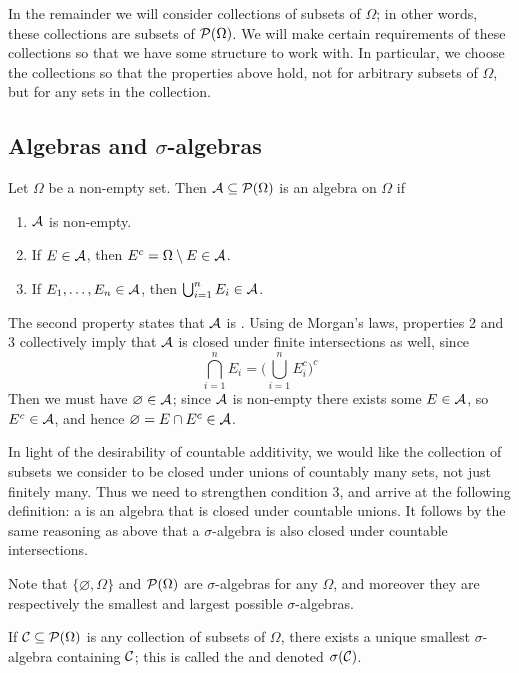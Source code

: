 \documentclass{article}
\begin{document}
In the remainder we will consider collections of subsets of $\Omega$; in other words, these collections are subsets of $\mathcal{P}(\Omega)$.
We will make certain requirements of these collections so that we have some structure to work with.
In particular, we choose the collections so that the properties above hold, not for arbitrary subsets of $\Omega$, but for any sets in the collection.

\subsection{Algebras and $\sigma$-algebras}
Let $\Omega$ be a non-empty set.
Then $\mathcal{A} \subseteq \mathcal{P}(\Omega)$ is an algebra on $\Omega$ if
\begin{enumerate}
\item $\mathcal{A}$ is non-empty.
\item If $E \in \mathcal{A}$, then $E^c = \Omega \setminus E \in \mathcal{A}$.
\item If $E_1, \dots, E_n \in \mathcal{A}$, then $\bigcup_{i=1}^n E_i \in \mathcal{A}$.
\end{enumerate}
The second property states that $\mathcal{A}$ is .
Using de Morgan's laws, properties 2 and 3 collectively imply that $\mathcal{A}$ is closed under finite intersections as well, since
\[\bigcap_{i=1}^n E_i = \bigg(\bigcup_{i=1}^n E_i^c\bigg)^c\]
Then we must have $\varnothing \in \mathcal{A}$; since $\mathcal{A}$ is non-empty there exists some $E \in \mathcal{A}$, so $E^c \in \mathcal{A}$, and hence $\varnothing = E \cap E^c \in \mathcal{A}$.

In light of the desirability of countable additivity, we would like the collection of subsets we consider to be closed under unions of countably many sets, not just finitely many.
Thus we need to strengthen condition 3, and arrive at the following definition: a  is an algebra that is closed under countable unions.
It follows by the same reasoning as above that a $\sigma$-algebra is also closed under countable intersections.

Note that $\{\varnothing, \Omega\}$ and $\mathcal{P}(\Omega)$ are $\sigma$-algebras for any $\Omega$, and moreover they are respectively the smallest and largest possible $\sigma$-algebras.

If $\mathcal{C} \subseteq \mathcal{P}(\Omega)$ is any collection of subsets of $\Omega$, there exists a unique smallest $\sigma$-algebra containing $\mathcal{C}$; this is called the  and denoted $\sigma(\mathcal{C})$.
\end{document}
